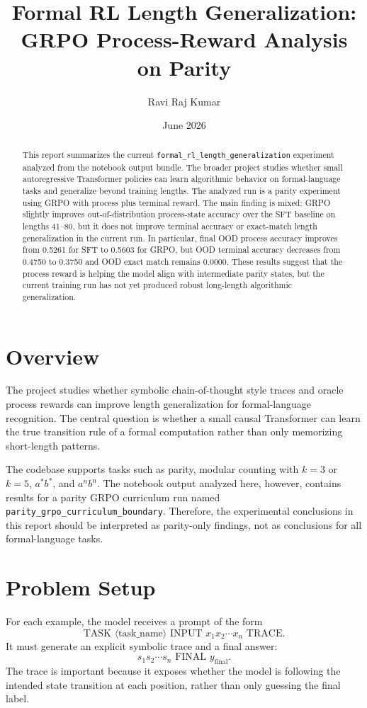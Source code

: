 \documentclass[11pt]{article}
\title{Formal RL Length Generalization: GRPO Process-Reward Analysis on Parity}
\author{Ravi Raj Kumar}
\date{June 2026}
\begin{document}
\maketitle

\begin{abstract}
This report summarizes the current \texttt{formal\_rl\_length\_generalization} experiment analyzed from the notebook output bundle. The broader project studies whether small autoregressive Transformer policies can learn algorithmic behavior on formal-language tasks and generalize beyond training lengths. The analyzed run is a parity experiment using GRPO with process plus terminal reward. The main finding is mixed: GRPO slightly improves out-of-distribution process-state accuracy over the SFT baseline on lengths 41--80, but it does not improve terminal accuracy or exact-match length generalization in the current run. In particular, final OOD process accuracy improves from 0.5261 for SFT to 0.5603 for GRPO, but OOD terminal accuracy decreases from 0.4750 to 0.3750 and OOD exact match remains 0.0000. These results suggest that the process reward is helping the model align with intermediate parity states, but the current training run has not yet produced robust long-length algorithmic generalization.
\end{abstract}

\section{Overview}
The project studies whether symbolic chain-of-thought style traces and oracle process rewards can improve length generalization for formal-language recognition. The central question is whether a small causal Transformer can learn the true transition rule of a formal computation rather than only memorizing short-length patterns.

The codebase supports tasks such as parity, modular counting with $k=3$ or $k=5$, $a^*b^*$, and $a^n b^n$. The notebook output analyzed here, however, contains results for a parity GRPO curriculum run named \texttt{parity\_grpo\_curriculum\_boundary}. Therefore, the experimental conclusions in this report should be interpreted as parity-only findings, not as conclusions for all formal-language tasks.

\section{Problem Setup}
For each example, the model receives a prompt of the form
\[
\text{TASK } \langle \text{task\_name} \rangle \text{ INPUT } x_1 x_2 \cdots x_n \text{ TRACE}.
\]
It must generate an explicit symbolic trace and a final answer:
\[
s_1 s_2 \cdots s_n \text{ FINAL } y_{\mathrm{final}}.
\]
The trace is important because it exposes whether the model is following the intended state transition at each position, rather than only guessing the final label.
\end{document}
